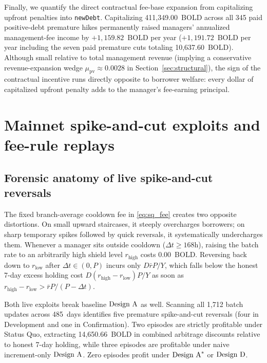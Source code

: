 Finally, we quantify the direct contractual fee-base expansion from capitalizing upfront penalties into \texttt{newDebt}. Capitalizing 411,349.00~BOLD across all 345 paid positive-debt premature hikes permanently raised managers' annualized management-fee income by $+1{,}159.82$~BOLD per year ($+1{,}191.72$~BOLD per year including the seven paid premature cuts totaling 10,637.60~BOLD). Although small relative to total management revenue (implying a conservative revenue-expansion wedge $\mu_{\text{pv}} \approx 0.0028$ in Section~\ref{sec:structural}), the sign of the contractual incentive runs directly opposite to borrower welfare: every dollar of capitalized upfront penalty adds to the manager's fee-earning principal.

\section{Mainnet spike-and-cut exploits and fee-rule replays}\label{sec:exploits}

\subsection{Forensic anatomy of live spike-and-cut reversals}\label{subsec:spike_cut}

The fixed branch-average cooldown fee in \eqref{eq:sq_fee} creates two opposite distortions. On small upward staircases, it steeply overcharges borrowers; on sharp temporary spikes followed by quick reversals, it systematically undercharges them. Whenever a manager sits outside cooldown ($\Delta t \ge 168\text{h}$), raising the batch rate to an arbitrarily high shield level $r_{\text{high}}$ costs 0.00~BOLD. Reversing back down to $r_{\text{low}}$ after $\Delta t \in (0, P)$ incurs only $D \bar{r} P / Y$, which falls below the honest 7-day excess holding cost $D (r_{\text{high}} - r_{\text{low}}) P / Y$ as soon as $r_{\text{high}} - r_{\text{low}} > \bar{r} P / (P - \Delta t)$.

Both live exploits break baseline $\text{Design A}$ as well. Scanning all 1,712 batch updates across 485~days identifies five premature spike-and-cut reversals (four in Development and one in Confirmation). Two episodes are strictly profitable under Status Quo, extracting 14,650.66~BOLD in combined arbitrage discounts relative to honest 7-day holding, while three episodes are profitable under naive increment-only $\text{Design A}$. Zero episodes profit under $\text{Design A}^*$ or $\text{Design D}$.

